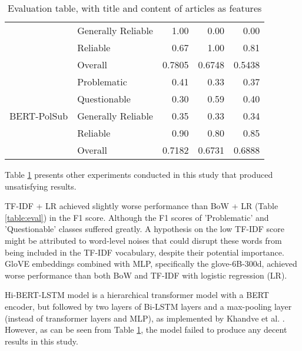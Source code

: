 \begin{table}[htbp]
\begin{longtable}{| c | l | r | r | r |}
                                                          & Generally Reliable & 1.00               & 0.00            & 0.00        \\
                                                          & Reliable           & 0.67               & 1.00            & 0.81        \\\cline{2-5}
                                                          & Overall            & 0.7805             & 0.6748          & 0.5438      \\
        \hline
        \multirow{5}{*}{BERT-PolSub}                      & Problematic        & 0.41               & 0.33            & 0.37        \\
                                                          & Questionable       & 0.30               & 0.59            & 0.40        \\
                                                          & Generally Reliable & 0.35               & 0.33            & 0.34        \\
                                                          & Reliable           & 0.90               & 0.80            & 0.85        \\\cline{2-5}
                                                          & Overall            & 0.7182             & 0.6731          & 0.6888      \\
        \hline
    \end{longtable}
    \caption{Evaluation table, with title and content of articles as features}
    \label{table:eval_failed}
\end{table}

Table \ref{table:eval_failed} presents other experiments conducted in this study that produced unsatisfying results.

TF-IDF + LR achieved slightly worse performance than BoW + LR (Table \ref{table:eval}) in the F1 score. Although the F1 scores of 'Problematic' and 'Questionable' classes suffered greatly. A hypothesis on the low TF-IDF score might be attributed to word-level noises that could disrupt these words from being included in the TF-IDF vocabulary, despite their potential importance. GloVE embeddings combined with MLP, specifically the glove-6B-300d, achieved worse performance than both BoW and TF-IDF with logistic regression (LR).

Hi-BERT-LSTM model is a hierarchical transformer model with a BERT encoder, but followed by two layers of Bi-LSTM layers and a max-pooling layer (instead of transformer layers and MLP), as implemented by Khandve et al. \cite{khandve-2022-hierarchical-longdoc}. However, as can be seen from Table \ref{table:eval_failed}, the model failed to produce any decent results in this study.

